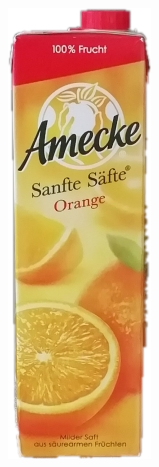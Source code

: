 \documentclass[a4paper,12pt,oneside]{article}
\begin{document}
\begin{figure}[htb]
\begin{minipage}[c]{0.08\textwidth}
\includegraphics[width=\textwidth]{Sources/Bild3_GW.png}

\end{minipage}
\end{figure}
\end{document}
